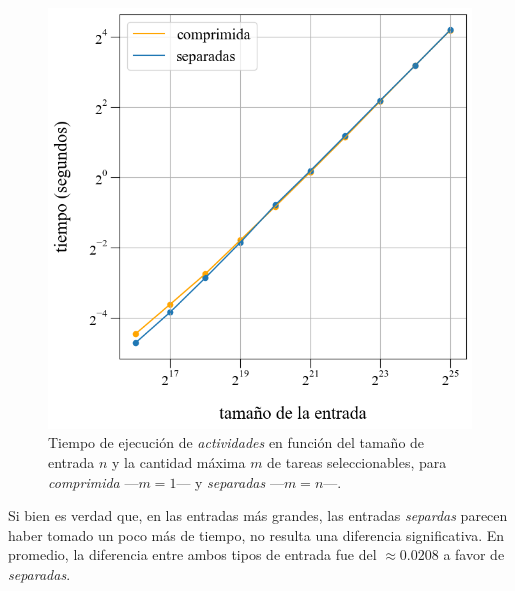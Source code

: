 \begin{figure}[!htbp]
    \includegraphics[scale=0.5, clip]{./files/src/.media/comparacion.png}
    \caption{Tiempo de ejecución de \textit{actividades} en función del tamaño de entrada $n$ y la cantidad máxima $m$ de tareas seleccionables, para \textit{comprimida} ---$m = 1$--- y \textit{separadas} ---$m = n$---.} \label{comparacion}
\end{figure}


Si bien es verdad que, en las entradas más grandes, las entradas \textit{separdas} parecen haber tomado un poco más de tiempo, no resulta una diferencia significativa. En promedio, la diferencia entre ambos tipos de entrada fue del $\approx 0.0208$ a favor de \textit{separadas}.